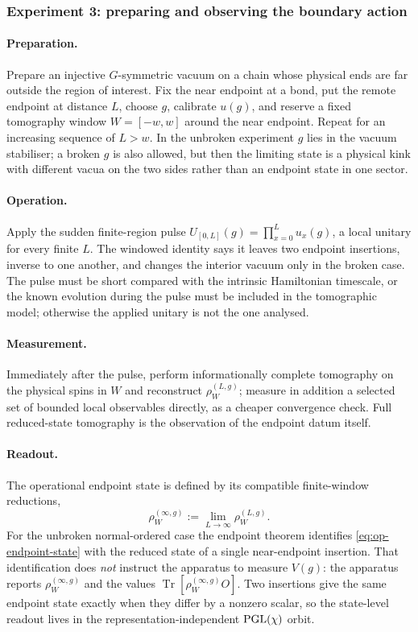 \subsubsection*{Experiment 3: preparing and observing the boundary action}

\paragraph{Preparation.} Prepare an injective $G$-symmetric vacuum on a chain
whose physical ends are far outside the region of interest. Fix the near
endpoint at a bond, put the remote endpoint at distance $L$, choose $g$,
calibrate $u(g)$, and reserve a fixed tomography window $W=[-w,w]$ around the
near endpoint. Repeat for an increasing sequence of $L>w$. In the unbroken
experiment $g$ lies in the vacuum stabiliser; a broken $g$ is also allowed,
but then the limiting state is a physical kink with different vacua on the two
sides rather than an endpoint state in one sector.

\paragraph{Operation.} Apply the sudden finite-region pulse
$U_{[0,L]}(g)=\prod_{x=0}^{L}u_x(g)$, a local unitary for every finite $L$.
The windowed identity says it leaves two endpoint insertions, inverse to one
another, and changes the interior vacuum only in the broken case. The pulse
must be short compared with the intrinsic Hamiltonian timescale, or the known
evolution during the pulse must be included in the tomographic model;
otherwise the applied unitary is not the one analysed.

\paragraph{Measurement.} Immediately after the pulse, perform informationally
complete tomography on the physical spins in $W$ and reconstruct
$\rho_W^{(L,g)}$; measure in addition a selected set of bounded local
observables directly, as a cheaper convergence check. Full reduced-state
tomography is the observation of the endpoint datum itself.

\paragraph{Readout.} The operational endpoint state is defined by its
compatible finite-window reductions,
\begin{equation}
  \rho_W^{(\infty,g)}:=\lim_{L\to\infty}\rho_W^{(L,g)}.
  \label{eq:op-endpoint-state}
\end{equation}
For the unbroken normal-ordered case the endpoint theorem identifies
\eqref{eq:op-endpoint-state} with the reduced state of a single near-endpoint
insertion. That identification does \emph{not} instruct the apparatus to
measure $V(g)$: the apparatus reports $\rho_W^{(\infty,g)}$ and the values
$\operatorname{Tr}[\rho_W^{(\infty,g)}O]$. Two insertions give the same
endpoint state exactly when they differ by a nonzero scalar, so the state-level
readout lives in the representation-independent $\mathrm{PGL}(\chi)$ orbit.

